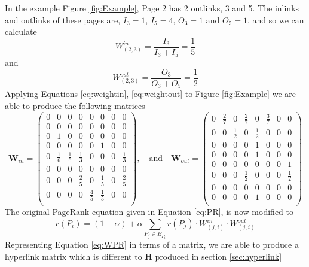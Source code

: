 \documentclass[11pt]{report}
\begin{document}
In the example Figure \ref{fig:Example}, Page 2 has 2 outlinks, 3 and 5. The inlinks and outlinks of these pages are, $I_3 = 1$, $I_5 = 4$, $O_3 = 1$ and $O_5 = 1$, and so we can calculate 
\[W^{in}_{(2,3)} = \frac{I_3}{I_3 + I_5} = \frac{1}{5} \]
and 
\[W^{out}_{(2,3)} = \frac{O_3}{O_3 + O_5} = \frac{1}{2} \] 
Applying Equations \eqref{eq:weightin}, \eqref{eq:weightout} to Figure \ref{fig:Example} we are able to produce the following matrices
\[ \textbf{W}_{in}=\left(
\begin{array}{cccccccc}
0 & 0 & 0 & 0 & 0 & 0 & 0 & 0 \\
0 & 0 & 0 & 0 & 0 & 0 & 0 & 0\\
0 & 1 & 0 & 0 & 0 & 0 & 0 & 0\\
0 & 0 & 0 & 0 & 0 & 1 & 0 & 0\\
0 & \frac{1}{6} & \frac{1}{6} & \frac{1}{3} & 0 & 0 & 0 & \frac{1}{3}\\
0 & 0 & 0 & 0 & 0 & 0 & 0 & 0 \\
0 & 0 & 0 & \frac{2}{5} & 0 & \frac{1}{5} & 0 & \frac{2}{5}\\
0 & 0 & 0 & 0 & \frac{4}{5} & \frac{1}{5} & 0 & 0\\
\end{array}
\right)\mathrm{,}\quad\mathrm{and}\quad \textbf{W}_{out}=\left(
\begin{array}{cccccccc}
0 & \frac{2}{7} & 0 & \frac{2}{7} & 0 &\frac{3}{7} & 0 & 0 \\
0 & 0 &\frac{1}{2}& 0 &\frac{1}{2}& 0 & 0 & 0\\
0 & 0 & 0 & 0 & 1 & 0 & 0 & 0\\
0 & 0 & 0 & 0 & 1 & 0 & 0 & 0\\
0 & 0 & 0 & 0 & 0 & 0 & 0 & 1\\
0 & 0 & 0 & \frac{1}{2} & 0 & 0 & 0 & \frac{1}{2} \\
0 & 0 & 0 & 0 & 0 & 0 & 0 & 0\\
0 & 0 & 0 & 0 & 1 & 0 & 0 & 0\\
\end{array}
\right)\]
The original PageRank equation given in Equation \eqref{eq:PR}, is now modified to 
\begin{equation} \label{eq:WPR}
r(P_i) = (1-\alpha) + \alpha \displaystyle \sum_{P_j\in B_{P_i }} r(P_j) \cdot W^{in}_{(j,i)} \cdot W^{out}_{(j,i)}
\end{equation}
Representing Equation \eqref{eq:WPR} in terms of a matrix, we are able to produce a hyperlink matrix which is different to \textbf{H} produced in section \ref{sec:hyperlink}
\end{document}
